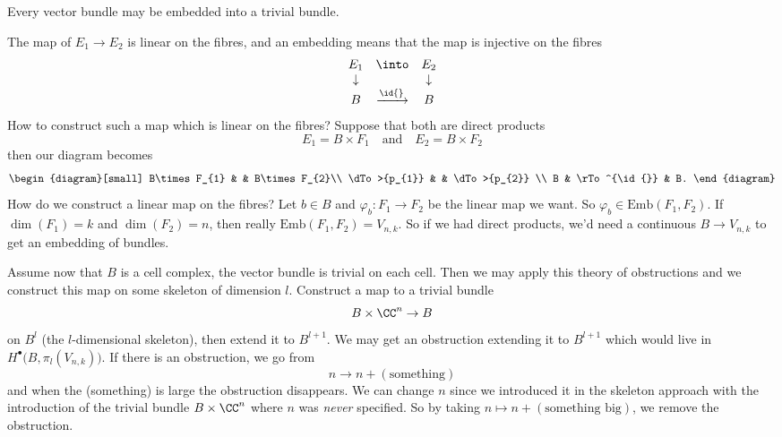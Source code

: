 \begin{lem}
Every vector bundle may be embedded into a trivial bundle.
\end{lem}
The map of $E_1\to E_2$ is linear on the fibres, and an embedding
means that the map is injective on the fibres
\begin{equation}
\begin{array}{ccc}
E_{1} & \into & E_{2} \\
\downarrow & & \downarrow\\
B     & \xrightarrow{\id{}} & B
\end{array}
\end{equation}
How to construct such a map which is linear on the fibres?
Suppose that both are direct products
\begin{equation}
E_{1}=B\times F_1\quad\mbox{and}\quad E_2=B\times F_2
\end{equation}
then our diagram becomes
\begin{equation}
\begin{diagram}[small]
B\times F_{1} & & B\times F_{2}\\
\dTo>{p_{1}} & & \dTo>{p_{2}} \\
B & \rTo^{\id{}} & B.
\end{diagram}
\end{equation}
How do we construct a linear map on the fibres? Let $b\in B$ and
$\varphi_b\colon F_1\to F_2$ be the linear map we want. So
$\varphi_b\in\mathrm{Emb}(F_1,F_2)$. If $\dim(F_{1})=k$ and
$\dim(F_{2})=n$, then really $\mathrm{Emb}(F_1,F_2)=V_{n,k}$. So
if we had direct products, we'd need a continuous $B\to V_{n,k}$
to get an embedding of bundles.

Assume now that $B$ is a cell complex, the vector bundle is
trivial on each cell. Then we may apply this theory of
obstructions and we construct this map on some skeleton of
dimension $l$. Construct a map to a trivial bundle
\begin{equation}
B\times\CC^n\to B
\end{equation}
on $B^l$ (the $l$-dimensional skeleton), then extend it to
$B^{l+1}$. We may get an obstruction extending it to $B^{l+1}$
which would live in $H^{\bullet}\bigl(B,\pi_{l}(V_{n,k})\bigr)$.
If there is an obstruction, we go from 
\begin{equation}
n\to n+(\mbox{something})
\end{equation}
and when the (something) is large the obstruction disappears. We
can change $n$ since we introduced it in the skeleton approach
with the introduction of the trivial bundle $B\times\CC^{n}$
where $n$ was \emph{never} specified. So by taking
$n\mapsto n+(\mbox{something big})$, we remove the obstruction.

